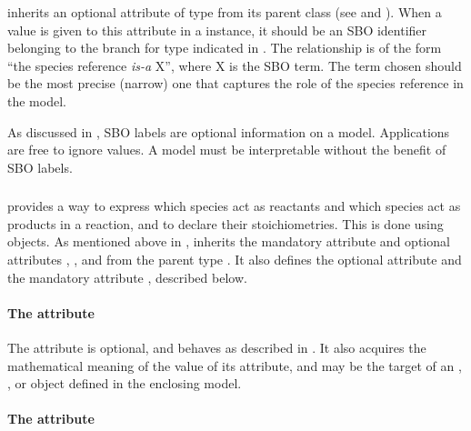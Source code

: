 \SimpleSpeciesReference inherits an optional 
attribute of type  from its parent class \SBase
(see  and ).  When
a value is given to this attribute in a \SimpleSpeciesReference
instance, it should be an SBO identifier belonging to the branch
for type \SimpleSpeciesReference indicated in
.  The relationship is of the
form ``the species reference \emph{is-a} X'', where X is the SBO
term.  The term chosen should be the most precise (narrow) one
that captures the role of the species reference in the model.

As discussed in , SBO labels are optional
information on a model.  Applications are free to ignore
 values.  A model must be interpretable without the
benefit of SBO labels.


\subsubsection{}
\label{subsec:speciesreference}

\Reaction provides a way to express which species act as reactants
and which species act as products in a reaction, and to declare
their stoichiometries.  This is done using \SpeciesReference
objects.  As mentioned above in
, \SpeciesReference
inherits the mandatory attribute  and optional
attributes , , and  from the
parent type \SimpleSpeciesReference.  It also defines the optional
attribute  and the mandatory attribute
, described below.


\paragraph{The  attribute}

The  attribute \vertwo{that \SpeciesReference inherits from \SBase\xspace}is optional, and behaves as described in .  It also acquires the mathematical meaning of the value of its  attribute, and may be the target of an \InitialAssignment, \EventAssignment, or \Rule object defined in the enclosing model.


\paragraph{The  attribute}

